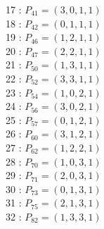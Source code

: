 \documentclass{article}
\begin{document}
{\begin{multicols}{3}
17 : $P_{41}=( 3, 0, 1, 1 )$\\
18 : $P_{42}=( 0, 1, 1, 1 )$\\
19 : $P_{46}=( 1, 2, 1, 1 )$\\
20 : $P_{47}=( 2, 2, 1, 1 )$\\
21 : $P_{50}=( 1, 3, 1, 1 )$\\
22 : $P_{52}=( 3, 3, 1, 1 )$\\
23 : $P_{54}=( 1, 0, 2, 1 )$\\
24 : $P_{56}=( 3, 0, 2, 1 )$\\
25 : $P_{57}=( 0, 1, 2, 1 )$\\
26 : $P_{60}=( 3, 1, 2, 1 )$\\
27 : $P_{62}=( 1, 2, 2, 1 )$\\
28 : $P_{70}=( 1, 0, 3, 1 )$\\
29 : $P_{71}=( 2, 0, 3, 1 )$\\
30 : $P_{73}=( 0, 1, 3, 1 )$\\
31 : $P_{75}=( 2, 1, 3, 1 )$\\
32 : $P_{82}=( 1, 3, 3, 1 )$\\
\end{multicols}


%


%


}%
\end{document}
